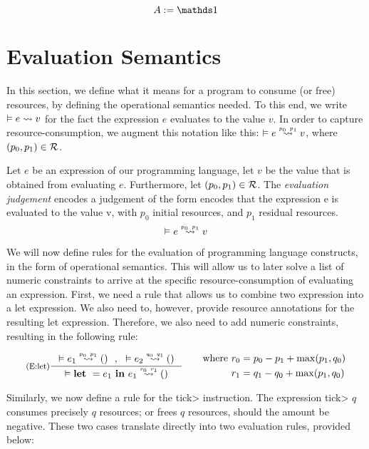\begin{definition}\label{fig:type-system}
   \[A := \unit \]
\end{definition}

\section{Evaluation Semantics}
In this section, we define what it means for a program to consume (or free) resources, by defining the operational semantics needed. To this end, we write \(\evals{}{e}{v}{}{}\) for the fact the expression \(e\) evaluates to the value \(v\). In order to capture resource-consumption, we augment this notation like this: \(\evals{}{e}{v}{p_0}{p_1}\), where \((p_0, p_1) \in \mathcal{R}\). 


\begin{definition}\label{def:evaluation-judgement}
   Let \(e\) be an expression of our programming language, let \(v\) be the value that is obtained from evaluating \(e\). Furthermore, let \((p_0, p_1) \in \mathcal{R}\). 
   The \emph{evaluation judgement} encodes a judgement of the form  encodes that the expression e is evaluated to the value v, with \(p_0\) initial resources, and \(p_1\) residual resources. 
   \[
      \evals{}{e}{v}{p_0}{p_1}
   \]
\end{definition}

We will now define rules for the evaluation of programming language constructs, in the form of operational semantics. This will allow us to later solve a list of numeric constraints to arrive at the specific resource-consumption of evaluating an expression.
First, we need a rule that allows us to combine two expression into a let expression. We also need to, however, provide resource annotations for the resulting let expression. Therefore, we also need to add numeric constraints, resulting in the following rule:

\[
   \inference[(E:let)]
   {\evals{}{e_1}{()}{p_0}{p_1} ~~,~~ \evals{}{e_2}{()}{q_0}{q_1}}
   {\evals{}{\letexp{}{e_1}{e_1}}{()}{r_0}{r_1}}
   \qquad
   \begin{aligned}
      \text{where }  &r_0 = p_0 - p_1 + \max(p_1, q_0)\\
                     &r_1 = q_1 - q_0 + \max(p_1, q_0) 
   \end{aligned}
\]

Similarly, we now define a rule for the \<tick> instruction. The expression \<tick> \(q\) consumes precisely \(q\) resources; or frees \(q\) resources, should the amount be negative. These two cases translate directly into two evaluation rules, provided below:

